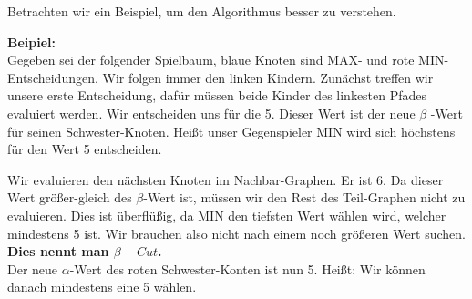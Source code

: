 Betrachten wir ein Beispiel, um den Algorithmus besser zu verstehen.

\textbf{Beipiel:}\\

Gegeben sei der folgender Spielbaum, blaue Knoten sind MAX- und rote MIN-Entscheidungen.
Wir folgen immer den linken Kindern. Zunächst treffen wir unsere erste Entscheidung, dafür müssen beide Kinder des linkesten Pfades evaluiert werden.
Wir entscheiden uns für die 5. Dieser Wert ist der neue $\beta$ -Wert für seinen Schwester-Knoten. Heißt unser Gegenspieler MIN wird sich höchstens für den Wert 5 entscheiden.

\begin{center}
\end{center}

Wir evaluieren den nächsten Knoten im Nachbar-Graphen. Er ist 6. Da dieser Wert größer-gleich des $\beta$-Wert ist, müssen wir den Rest des Teil-Graphen nicht zu evaluieren. Dies ist überflüßig, da MIN den tiefsten Wert wählen wird, welcher mindestens 5 ist. Wir brauchen also nicht nach einem noch größeren Wert suchen. \\
\textbf{Dies nennt man $\beta-Cut$.} \\
Der neue $\alpha$-Wert des roten Schwester-Konten ist nun 5. Heißt: Wir können danach mindestens eine 5 wählen.

\begin{center}
\end{center}

